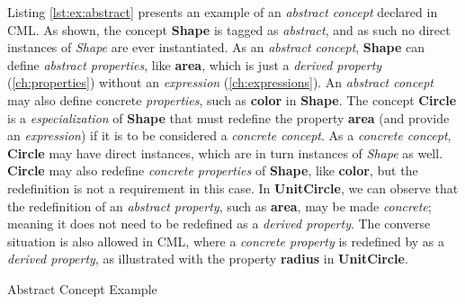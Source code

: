Listing \ref{lst:ex:abstract} presents an example of an \emph{abstract concept} declared in CML.
As shown, the concept \textbf{Shape} is tagged as \emph{abstract},
and as such no direct instances of \emph{Shape} are ever instantiated.
As an \emph{abstract concept}, \textbf{Shape} can define \emph{abstract properties},
like \textbf{area}, which is just a \emph{derived property} (\ref{ch:properties})
without an \emph{expression} (\ref{ch:expressions}).
An \emph{abstract concept} may also define concrete \emph{properties},
such as \textbf{color} in \textbf{Shape}.
The concept \textbf{Circle} is a \emph{especialization} of \textbf{Shape}
that must redefine the property \textbf{area}
(and provide an \emph{expression})
if it is to be considered a \emph{concrete concept}.
As a \emph{concrete concept},
\textbf{Circle} may have direct instances,
which are in turn instances of \emph{Shape} as well.
\textbf{Circle} may also redefine \emph{concrete properties} of \textbf{Shape},
like \textbf{color},
but the redefinition is not a requirement in this case.
In \textbf{UnitCircle},
we can observe that the redefinition of an \emph{abstract property},
such as \textbf{area},
may be made \emph{concrete};
meaning it does not need to be redefined as a \emph{derived property}.
The converse situation is also allowed in CML,
where a \emph{concrete property} is redefined by as a \emph{derived property},
as illustrated with the property \textbf{radius} in \textbf{UnitCircle}.

\begin{code}
\verbatimfont{\small}

\caption{Abstract Concept Example}
\label{lst:ex:abstract}
\end{code}

